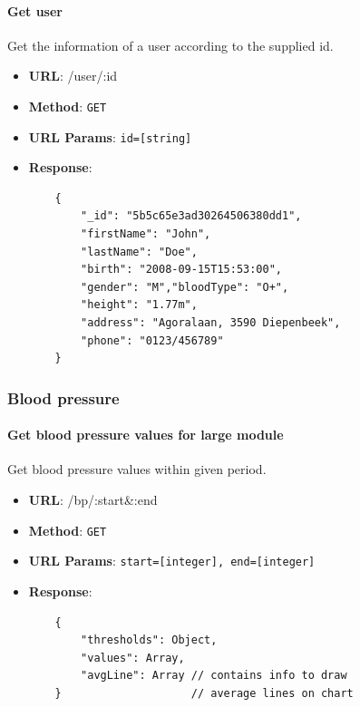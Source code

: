         \paragraph{Get user} Get the information of a user according to the supplied id.
        \begin{itemize}
            \item \textbf{URL}: /user/:id
            \item \textbf{Method}: \texttt{GET}
            \item \textbf{URL Params}: \texttt{id=[string]}
            \item \textbf{Response}: \begin{verbatim}
    {
        "_id": "5b5c65e3ad30264506380dd1",
        "firstName": "John",
        "lastName": "Doe",
        "birth": "2008-09-15T15:53:00",
        "gender": "M","bloodType": "O+",
        "height": "1.77m",
        "address": "Agoralaan, 3590 Diepenbeek",
        "phone": "0123/456789"
    }
            \end{verbatim}
        \end{itemize}

    \subsubsection{Blood pressure}

        \paragraph{Get blood pressure values for large module} Get blood pressure values within given period.
        \begin{itemize}
            \item \textbf{URL}: /bp/:start\&:end
            \item \textbf{Method}: \texttt{GET}
            \item \textbf{URL Params}: \texttt{start=[integer], end=[integer]}
            \item \textbf{Response}: \begin{verbatim}
    {
        "thresholds": Object,
        "values": Array,
        "avgLine": Array // contains info to draw 
    }                    // average lines on chart
            \end{verbatim}
        \end{itemize}

